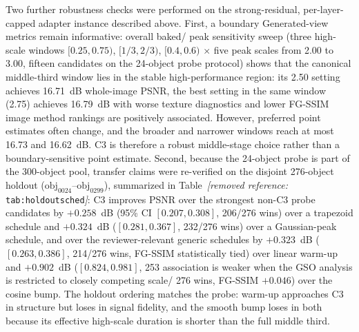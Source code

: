 \documentclass[times,twocolumn,final]{elsarticle}
\providecommand{\DIFadd}[1]{{\protect\color{blue} \sf #1}} %
\providecommand{\DIFdel}[1]{{\protect\color{red} \scriptsize #1}} %
\providecommand{\DIFaddbegin}{} %
\providecommand{\DIFaddend}{} %
\providecommand{\DIFdelbegin}{} %
\providecommand{\DIFdelend}{} %
\begin{document}
\DIFdelbegin \DIFdel{Two further robustness checks were performed on the strong-residual, per-layer-capped adapter instance described above. First, a boundary}\DIFdelend \DIFaddbegin \DIFadd{Generated-view metrics remain informative: overall baked}\DIFaddend /\DIFdelbegin \DIFdel{peak sensitivity sweep (three high-scale windows $[0.25,0.75)$, $[1/3,2/3)$, $[0.4,0.6)$ $\times$ five peak scales from 2.00 to 3.00, fifteen candidates on the 24-object probe protocol) shows that the canonical middle-third window lies in the stable high-performance region: its 2.50 setting achieves 16.71~dB whole-image PSNR, the best setting in the same window (2.75) achieves 16.79~dB with worse texture diagnostics and lower FG-SSIM}\DIFdelend \DIFaddbegin \DIFadd{image method rankings are positively associated. However, preferred point estimates often change}\DIFaddend , and the \DIFdelbegin \DIFdel{broader and narrower windows reach at most 16.73 and 16.62~dB. C3 is therefore a robust middle-stage choice rather than a boundary-sensitive point estimate. Second, because the 24-object probe is part of the 300-object pool, transfer claims were re-verified on the disjoint 276-object holdout ($\mathrm{obj}_{0024}$--$\mathrm{obj}_{0299}$), summarized in Table~\textit{[removed reference: }\texttt{tab:holdoutsched}\textit{]}: C3 improves PSNR over the strongest non-C3 probe candidates by $+0.258$~dB (95\% CI $[0.207,0.308]$, 206/276 wins) over a trapezoid schedule and $+0.324$~dB ($[0.281,0.367]$, 232/276 wins) over a Gaussian-peak schedule, and over the reviewer-relevant generic schedules by $+0.323$~dB ($[0.263,0.386]$, 214/276 wins, FG-SSIM statistically tied) over linear warm-up and $+0.902$~dB ($[0.824,0.981]$, 253}\DIFdelend \DIFaddbegin \DIFadd{association is weaker when the GSO analysis is restricted to closely competing scale}\DIFaddend /\DIFdelbegin \DIFdel{276 wins, FG-SSIM $+0.046$) over the cosine bump. The holdout ordering matches the probe: warm-up approaches C3 in structure but loses in signal fidelity, and the smooth bump loses in both because its effective high-scale duration is shorter than the full middle third. }%
\end{document}
